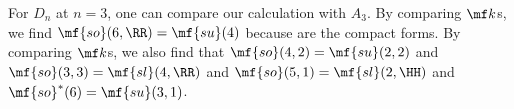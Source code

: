 \documentclass[../notes.tex]{subfiles}
\begin{document}
\begin{remark}
	For $D_n$ at $n=3$, one can compare our calculation with $A_3$. By comparing $\mf k$s, we find $\mf{so}(6,\RR)=\mf{su}(4)$ because are the compact forms. By comparing $\mf k$s, we also find that $\mf{so}(4,2)=\mf{su}(2,2)$ and $\mf{so}(3,3)=\mf{sl}(4,\RR)$ and $\mf{so}(5,1)=\mf{sl}(2,\HH)$ and $\mf{so}^*(6)=\mf{su}(3,1)$.
\end{remark}
\end{document}
